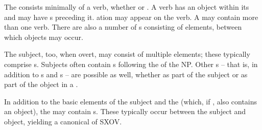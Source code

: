 The  consists minimally of a verb, whether  or . A  verb has an object within its  and may have s preceding it.  ation may appear on the verb. A  may contain more than one verb. There are also a number of s consisting of  elements, between which objects may occur.

The subject, too, when overt, may consist of multiple elements; these typically comprise s. Subjects often contain s following the  of the NP. Other s -- that is, in addition to s and s -- are possible as well, whether as part of the subject or as part of the object in a  .

In addition to the basic elements of the subject and the  (which, if , also contains an object), the  may contain s. These typically occur between the subject and object, yielding a canonical  of SXOV.

